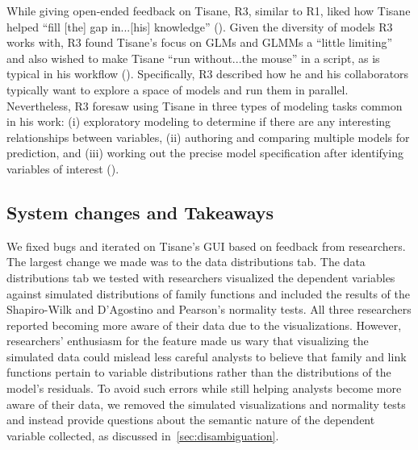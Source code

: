 While giving open-ended feedback on Tisane, R3, similar to R1, liked how Tisane helped ``fill
[the] gap in...[his] knowledge'' (\rqCognitive). Given the diversity of models
R3 works with, R3 found Tisane's focus on GLMs and GLMMs a ``little limiting'' and also
wished to make Tisane ``run without...the mouse'' in a script, as is typical in
his workflow (\rqWorkflow). Specifically, R3 described how he and his
collaborators typically want to explore a space of models and run them in
parallel. Nevertheless, R3 foresaw using Tisane in three types of modeling tasks
common in his work: (i) exploratory modeling to determine if there are any
interesting relationships between variables, (ii) authoring and comparing
multiple models for prediction, and (iii) working out the precise model
specification after identifying variables of interest (\rqFuture).

\subsection{System changes and Takeaways}

We fixed bugs and iterated on Tisane's GUI based on feedback from
researchers. The largest change we made was to the data distributions tab. The data distributions
tab we tested with researchers visualized the dependent variables
against simulated distributions of family functions and included the results of the Shapiro-Wilk and D'Agostino and Pearson's normality tests. All three researchers
reported becoming more aware of their data due to the visualizations. However, researchers' enthusiasm for the feature made us wary that visualizing the simulated data 
could mislead less careful analysts to believe that family and link functions pertain to variable
distributions rather than the distributions of the model's residuals. 
To avoid
such errors while still helping analysts become more aware of their data, we
removed the simulated visualizations and normality tests and instead provide questions about the semantic nature of the dependent variable
collected, as discussed in~\autoref{sec:disambiguation}.

